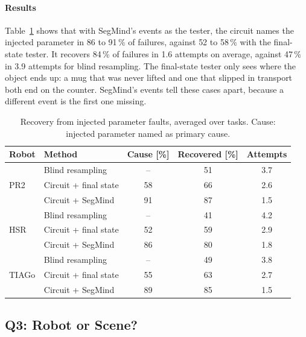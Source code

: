 \documentclass[letterpaper, 10 pt, conference]{ieeeconf}
\newcommand{\dummystyle}{\color{dummy}}
\newcommand{\dummystyle}{}
\newcommand{\dummy}[1]{{\dummystyle #1}}
\newcommand{\segmind}{SegMind}
\begin{document}
\paragraph*{Results}
Table~\ref{tab:recovery} shows that with \segmind{}'s events as the tester, the
circuit names the injected parameter in \dummy{86} to \dummy{91}\,\% of
failures, against \dummy{52} to \dummy{58}\,\% with the final-state tester. It
recovers \dummy{84}\,\% of failures in \dummy{1.6} attempts on average, against
\dummy{47}\,\% in \dummy{3.9} attempts for blind resampling. The final-state
tester only sees where the object ends up: a mug that was never lifted and one
that slipped in transport both end on the counter. \segmind{}'s events tell
these cases apart, because a different event is the first one missing.

\begin{table}[t]
  \centering
  \caption{Recovery from injected parameter faults, averaged over tasks. Cause:
  injected parameter named as primary cause.}
  \label{tab:recovery}
  \setlength{\tabcolsep}{3pt}
  \dummystyle
  \begin{tabular}{llccc}
    \toprule
    Robot & Method & Cause [\%] & Recovered [\%] & Attempts \\
    \midrule
    \multirow{3}{*}{PR2}
      & Blind resampling         & --   & 51 & 3.7 \\
      & Circuit + final state    & 58   & 66 & 2.6 \\
      & Circuit + \segmind{}     & 91   & 87 & 1.5 \\
    \midrule
    \multirow{3}{*}{HSR}
      & Blind resampling         & --   & 41 & 4.2 \\
      & Circuit + final state    & 52   & 59 & 2.9 \\
      & Circuit + \segmind{}     & 86   & 80 & 1.8 \\
    \midrule
    \multirow{3}{*}{TIAGo}
      & Blind resampling         & --   & 49 & 3.8 \\
      & Circuit + final state    & 55   & 63 & 2.7 \\
      & Circuit + \segmind{}     & 89   & 85 & 1.5 \\
    \bottomrule
  \end{tabular}
\end{table}

\subsection{Q3: Robot or Scene?}
\label{sec:exp-relational}
\end{document}
